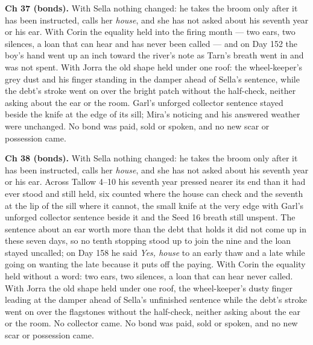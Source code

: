 \documentclass{design/chronicle}
\begin{document}
{\textbf{Ch 37 (bonds).} With Sella nothing changed: he takes the broom only after it has been instructed, calls her \emph{house}, and she has not asked about his seventh year or his ear. With Corin the equality held into the firing month --- two ears, two silences, a loan that can hear and has never been called --- and on Day 152 the boy’s hand went up an inch toward the river’s note as Tarn’s breath went in and was not spent. With Jorra the old shape held under one roof: the wheel-keeper’s grey dust and his finger standing in the damper ahead of Sella’s sentence, while the debt’s stroke went on over the bright patch without the half-check, neither asking about the ear or the room. Garl’s unforged collector sentence stayed beside the knife at the edge of its sill; Mira’s noticing and his answered weather were unchanged. No bond was paid, sold or spoken, and no new scar or possession came.

\textbf{Ch 38 (bonds).} With Sella nothing changed: he takes the broom only after it has been instructed, calls her \emph{house}, and she has not asked about his seventh year or his ear. Across Tallow 4–10 his seventh year pressed nearer its end than it had ever stood and still held, six counted where the house can check and the seventh at the lip of the sill where it cannot, the small knife at the very edge with Garl’s unforged collector sentence beside it and the Seed 16 breath still unspent. The sentence about an ear worth more than the debt that holds it did not come up in these seven days, so no tenth stopping stood up to join the nine and the loan stayed uncalled; on Day 158 he said \emph{Yes, house} to an early thaw and a late while going on wanting the late because it puts off the paying. With Corin the equality held without a word: two ears, two silences, a loan that can hear never called. With Jorra the old shape held under one roof, the wheel-keeper’s dusty finger leading at the damper ahead of Sella’s unfinished sentence while the debt’s stroke went on over the flagstones without the half-check, neither asking about the ear or the room. No collector came. No bond was paid, sold or spoken, and no new scar or possession came.

}
\end{document}
